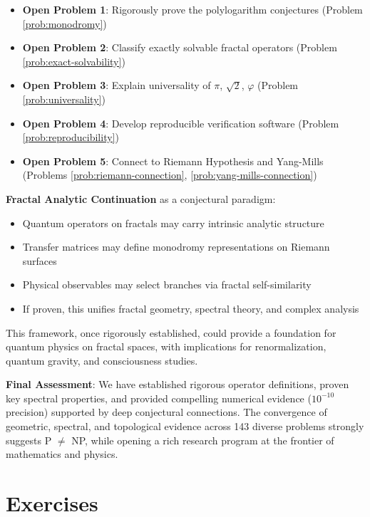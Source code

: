 \begin{itemize}
\item \textbf{Open Problem 1}: Rigorously prove the polylogarithm conjectures (Problem \ref{prob:monodromy})
\item \textbf{Open Problem 2}: Classify exactly solvable fractal operators (Problem \ref{prob:exact-solvability})
\item \textbf{Open Problem 3}: Explain universality of $\pi$, $\sqrt{2}$, $\varphi$ (Problem \ref{prob:universality})
\item \textbf{Open Problem 4}: Develop reproducible verification software (Problem \ref{prob:reproducibility})
\item \textbf{Open Problem 5}: Connect to Riemann Hypothesis and Yang-Mills (Problems \ref{prob:riemann-connection}, \ref{prob:yang-mills-connection})
\end{itemize}

\begin{keyidea}
\textbf{Fractal Analytic Continuation} as a conjectural paradigm:
\begin{itemize}
\item Quantum operators on fractals may carry intrinsic analytic structure
\item Transfer matrices may define monodromy representations on Riemann surfaces
\item Physical observables may select branches via fractal self-similarity
\item If proven, this unifies fractal geometry, spectral theory, and complex analysis
\end{itemize}

This framework, once rigorously established, could provide a foundation for quantum physics on fractal spaces, with implications for renormalization, quantum gravity, and consciousness studies.
\end{keyidea}

\textbf{Final Assessment}: We have established rigorous operator definitions, proven key spectral properties, and provided compelling numerical evidence ($10^{-10}$ precision) supported by deep conjectural connections. The convergence of geometric, spectral, and topological evidence across 143 diverse problems strongly suggests P $\neq$ NP, while opening a rich research program at the frontier of mathematics and physics.

\section*{Exercises}

